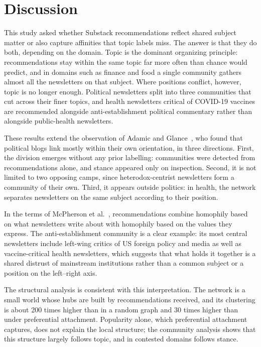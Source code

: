 \documentclass[sigchi]{acmart}
\begin{document}
\section{Discussion}
\label{sec:discussion}

This study asked whether Substack recommendations reflect shared
subject matter or also capture affinities that topic labels miss. The
answer is that they do both, depending on the domain. Topic is the
dominant organizing principle: recommendations stay within the same
topic far more often than chance would predict, and in domains such as
finance and food a single community gathers almost all the newsletters
on that subject. Where positions conflict, however, topic is no longer
enough. Political newsletters split into three communities that cut
across their finer topics, and health newsletters critical of COVID-19
vaccines are recommended alongside anti-establishment political
commentary rather than alongside public-health newsletters.

These results extend the observation of Adamic and
Glance~\cite{adamic2005political}, who found that political blogs link
mostly within their own orientation, in three directions. First, the
division emerges without any prior labelling: communities were detected
from recommendations alone, and stance appeared only on inspection.
Second, it is not limited to two opposing camps, since heterodox-centrist
newsletters form a community of their own. Third, it appears outside
politics: in health, the network separates newsletters on the same
subject according to their position.

In the terms of
McPherson et al.~\cite{mcpherson2001birds}, recommendations combine
homophily based on what newsletters write about with homophily based
on the values they express. The anti-establishment community is a clear example: its most central newsletters include left-wing critics of US foreign policy and media as well as vaccine-critical health newsletters, which suggests that what holds it together is a shared distrust of mainstream institutions rather than a
common subject or a position on the left--right axis.

The structural analysis is consistent with this interpretation. The network
is a small world whose hubs are built by recommendations received, and
its clustering is about 200 times higher than in a random graph and 30 times higher than under preferential attachment. Popularity alone, which preferential attachment captures, does not explain the local structure; the community analysis shows that this structure largely follows topic, and in contested domains follows stance.
\end{document}
